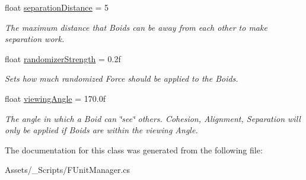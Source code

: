 \begin{DoxyCompactItemize}
float \hyperlink{class_f_unit_manager_a99ced2e66851fd9dc1356935710cb315}{separation\+Distance} = 5
\begin{DoxyCompactList}\small\item\em The maximum distance that Boids can be away from each other to make separation work. \end{DoxyCompactList}\item 
\mbox{\label{class_f_unit_manager_a4e7f24e9faeda6f66ab7f5a6d193cff6}} 
float \hyperlink{class_f_unit_manager_a4e7f24e9faeda6f66ab7f5a6d193cff6}{randomizer\+Strength} = 0.\+2f
\begin{DoxyCompactList}\small\item\em Sets how much randomized Force should be applied to the Boids. \end{DoxyCompactList}\item 
\mbox{\label{class_f_unit_manager_ad341d31117c315aa6c66bfd8fb6e848b}} 
float \hyperlink{class_f_unit_manager_ad341d31117c315aa6c66bfd8fb6e848b}{viewing\+Angle} = 170.\+0f
\begin{DoxyCompactList}\small\item\em The angle in which a Boid can \char`\"{}see\char`\"{} others. Cohesion, Alignment, Separation will only be applied if Boids are within the viewing Angle. \end{DoxyCompactList}\end{DoxyCompactItemize}


The documentation for this class was generated from the following file\+:\begin{DoxyCompactItemize}
\item 
Assets/\+\_\+\+Scripts/F\+Unit\+Manager.\+cs\end{DoxyCompactItemize}
